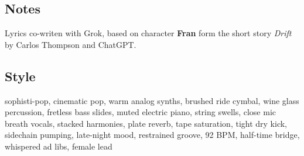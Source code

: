 \subsection{Notes}
Lyrics co-writen with Grok, based on character \textbf{Fran} form the short story \emph{Drift} by Carlos Thompson and ChatGPT.

\subsection{Style}
sophisti-pop, cinematic pop, warm analog synths, brushed ride cymbal, wine glass percussion, fretless bass slides, muted electric piano, string swells, close mic breath vocals, stacked harmonies, plate reverb, tape saturation, tight dry kick, sidechain pumping, late-night mood, restrained groove, 92 BPM, half-time bridge, whispered ad libs, female lead

